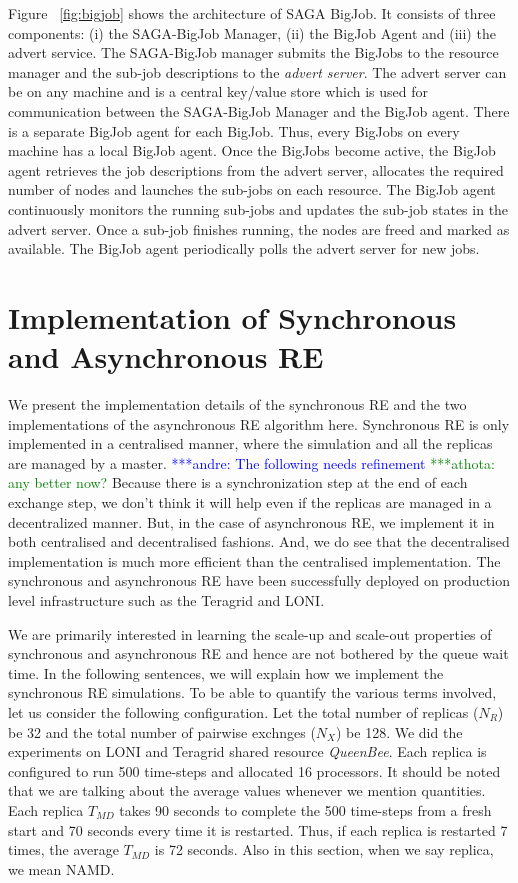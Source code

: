 \documentclass{rspublic}
\newcommand{\alnote}[1]{ {\textcolor{blue} { ***andre: #1 }}}
\newcommand{\athotanote}[1]{ {\textcolor{green} { ***athota: #1 }}}
\newcommand{\alnote}[1]{}
\newcommand{\athotanote}[1]{}
\begin{document}
Figure ~\ref{fig:bigjob} shows the architecture of SAGA BigJob.
It consists of three components: (i) the SAGA-BigJob Manager, (ii) the BigJob Agent and (iii) the advert service. The SAGA-BigJob manager submits the BigJobs to the resource manager and the sub-job descriptions to the \emph{advert server}. The advert server can be on any machine and is a central key/value store which is used for communication between the SAGA-BigJob Manager and the BigJob agent. There is a separate BigJob agent for each BigJob. Thus, every BigJobs on every machine has a local BigJob agent. Once the BigJobs become active, the BigJob agent retrieves the job descriptions from the advert server, allocates the required number of nodes and launches the sub-jobs on each resource. The BigJob agent continuously monitors the running sub-jobs and updates the sub-job states in the advert server. Once a sub-job finishes running, the nodes are freed and marked as available. The BigJob agent periodically polls the advert server for new jobs.


\section{Implementation of Synchronous and Asynchronous RE}
We present the implementation details of the synchronous RE and the two 
implementations of the asynchronous RE algorithm here. Synchronous RE is 
only implemented in a centralised manner, where the simulation and all the 
replicas are managed by a master. 
\alnote{The following needs refinement}\athotanote{any better now?} Because there is a synchronization step at the end of each exchange step, we don't think it will help even if the replicas are managed in a decentralized manner. %
But, in the case of asynchronous RE, we implement it in both 
centralised and decentralised  fashions. And, we do see that the decentralised 
implementation is much more efficient than the centralised implementation.
The synchronous and asynchronous RE have been successfully deployed on production 
level infrastructure such as the Teragrid and LONI. 

We are primarily interested in learning the scale-up and scale-out properties of synchronous and asynchronous RE and hence are not bothered by the queue wait time. In the following sentences, we will explain how we implement the synchronous RE simulations. To be able to quantify the various terms involved, let us consider the following configuration. Let the total number of replicas ($N_R$) be 32 and the total number of pairwise exchnges ($N_X$) be 128. We did the experiments on LONI and Teragrid shared resource \emph{QueenBee}. Each replica is configured to run 500 time-steps and allocated 16 processors. It should be noted that we are talking about the average values whenever we mention quantities. Each replica $T_{MD}$ takes 90 seconds to complete the 500 time-steps from a fresh start and 70 seconds every time it is restarted. Thus, if each replica is restarted 7 times, the average $T_{MD}$ is 72 seconds. Also in this section, when we say replica, we mean NAMD.
\end{document}
